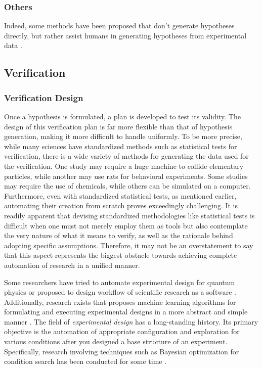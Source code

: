 \documentclass{book}
\begin{document}
\subsubsection{Others} 

Indeed, some methods have been proposed that don't generate hypotheses directly, but rather assist humans in generating hypotheses from experimental data 
 \cite{friederich2021scientific}.

\subsection{Verification}
\subsubsection{Verification Design}

Once a hypothesis is formulated, a plan is developed to test its validity. The design of this verification plan is far more flexible than that of hypothesis generation, making it more difficult to handle uniformly. To be more precise, while many sciences have standardized methods such as statistical tests for verification, there is a wide variety of methods for generating the data used for the verification. One study may require a huge machine to collide elementary particles, while another may use rats for behavioral experiments. Some studies may require the use of chemicals, while others can be simulated on a computer. Furthermore, even with standardized statistical tests, as mentioned earlier, automating their creation from scratch proves exceedingly challenging. It is readily apparent that devising standardized methodologies like statistical tests is difficult when one must not merely employ them as tools but also contemplate the very nature of what it means to verify, as well as the rationale behind adopting specific assumptions. Therefore, it may not be an overstatement to say that this aspect represents the biggest obstacle towards achieving complete automation of research in a unified manner.

Some researchers have tried to automate experimental design for quantum physics \cite{ruiz2022digital} or proposed to design workflow of scientific research as a software \cite{goble2020fair}. Additionally, research exists that proposes machine learning algorithms for formulating and executing experimental designs in a more abstract and simple manner \cite{herrmann2022learning}. The field of \textit{experimental design} has a long-standing history. Its primary objective is the automation of appropriate configuration and exploration for various conditions after you designed a base structure of an experiment. Specifically, research involving techniques such as Bayesian optimization for condition search has been conducted for some time \cite{chaloner1995bayesian,shahriari2015taking}.
\end{document}
